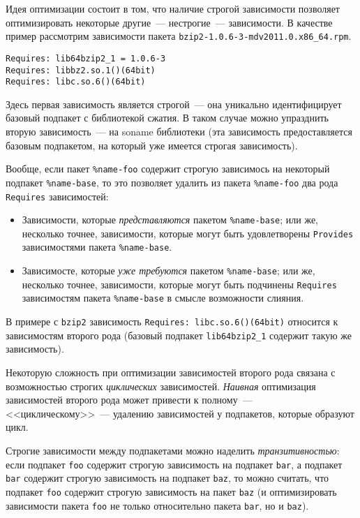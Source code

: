 \documentclass[russian,a4paper,12pt,titlepage]{article}
\begin{document}
Идея оптимизации состоит в том, что наличие строгой зависимости позволяет
оптимизировать некоторые другие~--- нестрогие~--- зависимости.  В качестве пример
рассмотрим зависимости пакета \verb|bzip2-1.0.6-3-mdv2011.0.x86_64.rpm|.
\begin{verbatim}
Requires: lib64bzip2_1 = 1.0.6-3
Requires: libbz2.so.1()(64bit)
Requires: libc.so.6()(64bit)
\end{verbatim}
Здесь первая зависимость является строгой~--- она уникально идентифицирует базовый подпакет с библиотекой сжатия.
В таком случае можно упразднить вторую зависимость~--- на soname библиотеки (эта зависимость предоставляется
базовым подпакетом, на который уже имеется строгая зависимость).

Вообще, если пакет \verb|%name-foo| содержит строгую зависимось на некоторый подпакет \verb|%name-base|,
то это позволяет удалить из пакета \verb|%name-foo| два рода \verb|Requires| зависимостей:
\begin{itemize}
\item Зависимости, которые \textit{представляются} пакетом \verb|%name-base|; или же, несколько точнее,
зависимости, которые могут быть удовлетворены \verb|Provides| зависимостями пакета \verb|%name-base|.
\item Зависимосте, которые \textit{уже требуются} пакетом \verb|%name-base|; или же, несколько точнее,
зависимости, которые могут быть подчинены \verb|Requires| зависимостям пакета \verb|%name-base|
в смысле возможности слияния.
\end{itemize}
В примере с \verb|bzip2| зависимость \verb|Requires: libc.so.6()(64bit)| относится к зависимостям второго рода
(базовый подпакет \verb|lib64bzip2_1| содержит такую же зависимость).

Некоторую сложность при оптимизации зависимостей второго рода связана с возможностью строгих \textit{циклических}
зависимостей.  \textit{Наивная} оптимизация зависимостей второго рода может привести к полному~--- <<циклическому>>~---
удалению зависимостей у подпакетов, которые образуют цикл.

Строгие зависимости между подпакетами можно наделить \textit{транзитивностью}: если подпакет \verb|foo| содержит
строгую зависимость на подпакет \verb|bar|, а подпакет \verb|bar| содержит строгую зависимость на подпакет \verb|baz|,
то можно считать, что подпакет \verb|foo| содержит строгую зависимость на пакет \verb|baz| (и оптимизировать зависимости
пакета \verb|foo| не только относительно пакета \verb|bar|, но и \verb|baz|).
\end{document}
